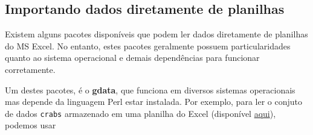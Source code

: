 \documentclass[10pt,a4paper]{book}
\begin{document}
\subsection{Importando dados diretamente de
planilhas}\label{importando-dados-diretamente-de-planilhas}

Existem alguns pacotes disponíveis que podem ler dados diretamente de
planilhas do MS Excel. No entanto, estes pacotes geralmente possuem
particularidades quanto ao sistema operacional e demais dependências
para funcionar corretamente.

Um destes pacotes, é o \textbf{gdata}, que funciona em diversos sistemas
operacionais mas depende da linguagem Perl estar instalada. Por exemplo,
para ler o conjuto de dados \texttt{crabs} armazenado em uma planilha do
Excel (disponível
\href{http://leg.ufpr.br/~fernandomayer/data/crabs.xls}{aqui}), podemos
usar
\end{document}
